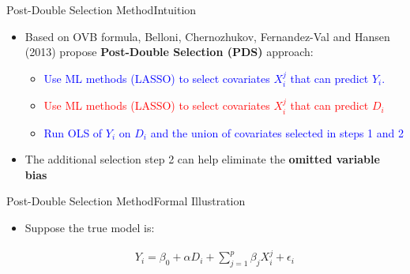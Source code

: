 \documentclass[hyperref={pdfpagelabels=false}]{beamer}
\begin{document}
\begin{frame}{Post-Double Selection Method}{Intuition}
	
	\begin{itemize}
		
	
		\item Based on OVB formula, Belloni, Chernozhukov, Fernandez-Val and Hansen (2013) propose \textbf{Post-Double Selection (PDS)} approach: 
		\begin{itemize}
			\vspace{0.2cm}
			\item[1] \textcolor{blue}{Use ML methods (LASSO) to select covariates $X^{j}_{i}$ that can predict $Y_{i}$.}
			\vspace{0.2cm}
			\item[2] \textcolor{red}{Use ML methods (LASSO) to select covariates $X^{j}_{i}$ that can predict $D_{i}$}
			\vspace{0.2cm}
			\item[3] \textcolor{blue}{Run OLS of $Y_{i}$ on $D_{i}$ and the union of covariates selected in steps 1 and 2}
		\end{itemize}
		\item The additional selection step 2 can help eliminate the \textbf{omitted variable bias}
	\end{itemize}
\end{frame}




\begin{frame}{Post-Double Selection Method}{Formal Illustration}

\begin{itemize}
	\item Suppose the true model is:
	
	\begin{eqnarray*}
	Y_{i} = \beta_{0} + \alpha D_{i} + \sum^{p}_{j=1} \beta_{j} X^{j}_{i}  + \epsilon_{i}
\end{eqnarray*}	
	


	
\end{itemize}

\end{frame}
\end{document}
